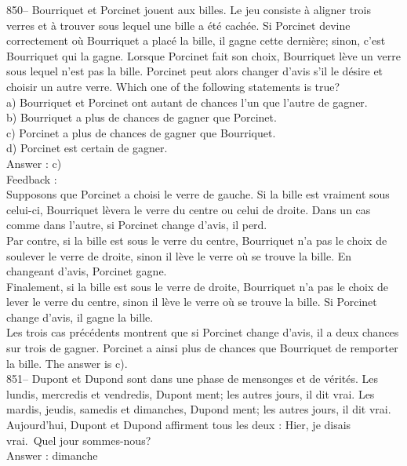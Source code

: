\documentclass[letterpaper, 12pt]{article}
\begin{document}
850-- Bourriquet et Porcinet jouent aux billes.  Le jeu consiste \`a aligner
trois verres et \`a trouver sous lequel une bille a \'et\'e cach\'ee. Si
Porcinet devine correctement o\`u Bourriquet a plac\'e la bille, il gagne
cette derni\`ere; sinon, c'est Bourriquet qui la gagne.  Lorsque Porcinet
fait son choix, Bourriquet l\`eve un verre sous lequel n'est pas la bille.
Porcinet peut alors changer d'avis s'il le d\'esire et choisir un autre
verre.  Which one of the following statements is true?\\
a) Bourriquet et Porcinet ont autant de chances l'un que l'autre de
gagner.\\
b) Bourriquet a plus de chances de gagner que Porcinet.\\
c) Porcinet a plus de chances de gagner que Bourriquet.\\
d) Porcinet est certain de gagner.\\

Answer : c)\\

Feedback : \\
Supposons que Porcinet a choisi le verre de gauche. Si la bille est vraiment
sous celui-ci, Bourriquet l\`evera le verre du centre ou celui de droite.
Dans un cas comme dans l'autre, si Porcinet change d'avis, il perd.  \\
Par contre, si la bille est sous le verre du centre, Bourriquet n'a pas le
choix de soulever le verre de droite, sinon il l\`eve le verre o\`u se
trouve la bille.  En changeant d'avis, Porcinet gagne.\\
Finalement, si la bille est sous le verre de droite, Bourriquet n'a pas le
choix de lever le verre du centre, sinon il l\`eve le verre o\`u se trouve
la bille.  Si Porcinet change d'avis, il gagne la bille.\\
Les trois cas pr\'ec\'edents montrent que si Porcinet change d'avis, il a
deux chances sur trois de gagner.  Porcinet a ainsi plus de chances que
Bourriquet de remporter la bille.  The answer is c).\\

851-- Dupont et Dupond sont dans une phase de mensonges et de v\'erit\'es.
Les lundis, mercredis et vendredis, Dupont ment; les autres jours, il dit
vrai.  Les mardis, jeudis, samedis et dimanches, Dupond ment; les autres
jours, il dit vrai.  Aujourd'hui, Dupont et Dupond affirment tous les deux :
\og Hier, je disais vrai.\fg\  Quel jour sommes-nous?\\

Answer : dimanche\\
\end{document}
